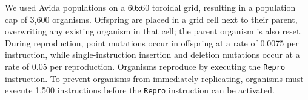 We used Avida populations on a 60x60 toroidal grid, resulting in a population cap of 3,600 organisms.
Offspring are placed in a grid cell next to their parent, overwriting any existing organism in that cell; the parent organism is also reset.%
During reproduction, point mutations occur in offspring at a rate of 0.0075 per instruction, while single-instruction insertion and deletion mutations occur at a rate of 0.05 per reproduction.
Organisms reproduce by %
executing the \texttt{Repro} instruction.
To prevent organisms from immediately replicating,%
organisms must execute 1,500 instructions before the \texttt{Repro} instruction can be activated.  



